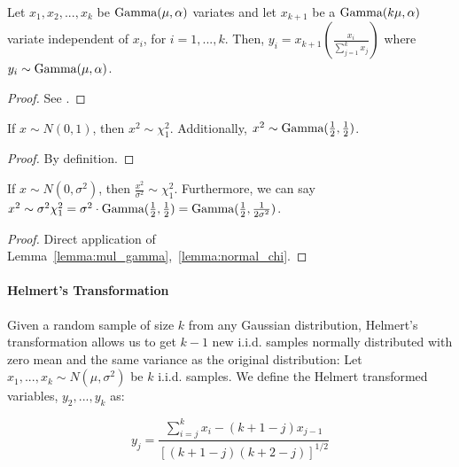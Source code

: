 \begin{lem} Let $x_1, x_2, ..., x_k$ be $\textup{Gamma}(\mu, \alpha)$ variates and let $x_{k+1}$ be a $\textup{Gamma}(k\mu, \alpha)$ variate independent of $x_i$, for $i = 1, ..., k$. Then, $y_i = x_{k+1}(\frac{x_i}{\sum_{j=1}^{k} x_j})$ where $y_i \sim \textup{Gamma}(\mu, \alpha)$.
\label{lemma:many_gamma}
\end{lem}
\begin{proof} See \cite{aitchison1963inverse}.
\end{proof}

\begin{lem} If $x \sim N(0, 1)$, then $x^2 \sim \chi^2_1$. Additionally, $x^2 \sim \textup{Gamma}(\frac{1}{2}, \frac{1}{2})$.
\label{lemma:normal_chi}
\end{lem}
\begin{proof} By definition.
\end{proof}

\begin{corollary} If $x \sim N(0, \sigma^2)$, then $\frac{x^2}{\sigma^2} \sim \chi^2_1$. Furthermore, we can say $x^2 \sim \sigma^2 \chi^2_1 = \sigma^2 \cdot \textup{Gamma}(\frac{1}{2}, \frac{1}{2}) = \textup{Gamma}(\frac{1}{2}, \frac{1}{2\sigma^2})$.
\label{corollary:normal_gamma}
\end{corollary}

\begin{proof} Direct application of Lemma~\ref{lemma:mul_gamma},~\ref{lemma:normal_chi}.
\end{proof}

\paragraph{Helmert's Transformation}

Given a random sample of size $k$ from any Gaussian distribution, Helmert's transformation \cite{helmert1875berechnung,pegoraro2012transformation} allows us to get $k-1$ new i.i.d. samples normally distributed with zero mean and the same variance as the original distribution: Let $x_1, ..., x_k \sim N(\mu, \sigma^2)$ be $k$ i.i.d. samples. We define the Helmert transformed variables, $y_2, ..., y_k$ as:

\begin{equation}
    y_j = \frac{\sum_{i=j}^{k} x_i - (k + 1 - j) x_{j-1}}{[(k + 1 - j)(k + 2 - j)]^{1/2}}
\label{eqn:helmert}
\end{equation}

